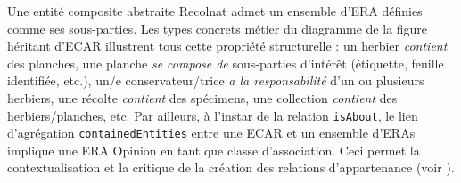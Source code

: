 \stopsubsection
\startsubsection[title={Entité composite abstraite Recolnat (ECAR)}]

Une entité composite abstraite Recolnat admet un ensemble d'ERA définies comme ses sous-parties.
Les types concrets métier du diagramme de la figure  héritant d'ECAR illustrent tous cette propriété structurelle : un herbier {\it contient} des planches, une planche {\it se compose de} sous-parties d'intérêt (étiquette, feuille identifiée, etc.), un/e conservateur/trice {\it a la responsabilité} d'un ou plusieurs herbiers, une récolte {\it contient} des spécimens, une collection {\it contient} des herbiers/planches, etc.
Par ailleurs, à l'instar de la relation {\tt isAbout}, le lien d'agrégation {\tt containedEntities} entre une ECAR et un ensemble d'ERAs implique une ERA Opinion en tant que classe d'association.
Ceci permet la contextualisation et la critique de la création des relations d'appartenance (voir ).

\stopsubsection
\stopsection
\stopchapter